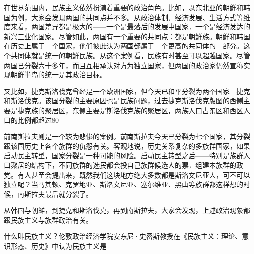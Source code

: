 





在世界范围内，民族主义依然扮演着重要的政治角色。比如，以东北亚的朝鲜和韩国为例，大家会发现两国的共同点并不多。从政治体制、经济发展、生活方式等维度来看，两国差异都是极大的——一个是最落后的发展中国家，一个是经济发达的新兴工业化国家。尽管如此，两国有一个重要的共同点：都是朝鲜族。朝鲜和韩国在历史上属于一个国家，他们彼此认为两国都属于一个更高的共同体的一部分。这个共同体就是统一的朝鲜民族。从这个案例看，民族有时甚至可以超越国家。尽管两国已分裂六十多年，而且互相承认对方为独立国家，但两国的政治家仍然宣称实现朝鲜半岛的统一是其政治目标。

又比如，捷克斯洛伐克曾经是一个欧洲国家，但今天已和平分裂为两个国家：捷克和斯洛伐克。该国分裂的主要原因也是民族问题，过去捷克斯洛伐克版图的西侧主要是捷克族的聚居区，东侧主要是斯洛伐克族的聚居区，两族人口占东区和西区人口的比例都超过80%

前南斯拉夫则是一个较为悲惨的案例。前南斯拉夫今天已分裂为七个国家，其分裂跟该国历史上各个族群的仇怨有关。客观地说，历史关系复杂的多族群国家，如果启动民主转型，国家分裂是一种可能的风险。启动民主转型之后——特别是族群人口聚居的结构下，不同族群的选民都会投自己族群候选人的票，组建本族群的政党。有人甚至会提出来，既然我们这块地方绝大多数都是斯洛文尼亚人，可不可以独立呢？当马其顿、克罗地亚、斯洛文尼亚、塞尔维亚、黑山等族群都这样想的时候，南斯拉夫最后就分裂了。

从韩国与朝鲜，到捷克和斯洛伐克，再到南斯拉夫，大家会发现，上述政治现象都跟民族主义与族群政治有关。

什么叫民族主义？伦敦政治经济学院安东尼·史密斯教授在《民族主义：理论、意识形态、历史》中认为民族主义是——

